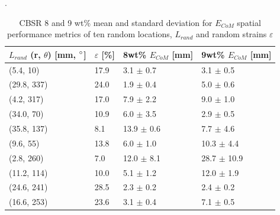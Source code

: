 \begin{table}[H]
    \caption{CBSR 8 and 9 wt\% mean and standard deviation for $E_{CoM}$ spatial performance metrics of ten random locations, $L_{rand}$ and random strains $\varepsilon$}. %
    \label{table:spatial_ecom_metrics_stats_8p_rand_loads}
    \centering
    \begin{tabular}{p{1.8cm}p{1.0cm}p{2.0cm}p{2.0cm}}
        \hline       
        $L_{rand}$ (r, $\theta$) [mm, $\degree$] & $\varepsilon$ [\%] & 8wt\% $E_{CoM}$ [mm] & 9wt\% $E_{CoM}$ [mm] \\ \hline
        (5.4, 10) & 17.9 & 3.1 $\pm$ 0.7 & 3.1 $\pm$ 0.5 \\
        (29.8, 337) & 24.0 & 1.9 $\pm$ 0.4 & 5.0 $\pm$ 0.6 \\
        (4.2, 317) & 17.0 & 7.9 $\pm$ 2.2 & 9.0 $\pm$ 1.0 \\
        (34.0, 70) & 10.9 & 6.0 $\pm$ 3.5 & 2.9 $\pm$ 0.5 \\
        (35.8, 137) & 8.1 & 13.9 $\pm$ 0.6 & 7.7 $\pm$ 4.6 \\
        (9.6, 55) & 13.8 & 6.0 $\pm$ 1.0 & 10.3 $\pm$ 4.4 \\
        (2.8, 260) & 7.0 & 12.0 $\pm$ 8.1 & 28.7 $\pm$ 10.9 \\
        (11.2, 114) & 10.0 & 5.1 $\pm$ 1.2 & 12.0 $\pm$ 1.9 \\
        (24.6, 241) & 28.5 & 2.3 $\pm$ 0.2 & 2.4 $\pm$ 0.2 \\
        (16.6, 253) & 23.6 & 3.1 $\pm$ 0.4 & 7.1 $\pm$ 0.5 \\
        \hline
    \end{tabular}
\end{table}

